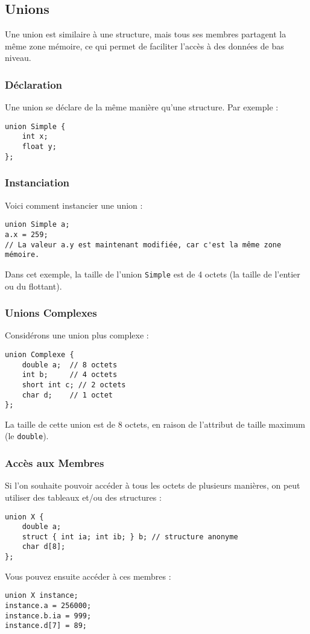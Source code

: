 \documentclass[french,11pt]{article}
\begin{document}
\subsection{Unions}
Une union est similaire à une structure, mais tous ses membres partagent la même zone mémoire, ce qui permet de faciliter l'accès à des données de bas niveau.

\subsubsection{Déclaration}
Une union se déclare de la même manière qu'une structure. Par exemple :
\begin{verbatim}
union Simple {
    int x;
    float y;
};
\end{verbatim}

\subsubsection{Instanciation}
Voici comment instancier une union :
\begin{verbatim}
union Simple a;
a.x = 259;
// La valeur a.y est maintenant modifiée, car c'est la même zone mémoire.
\end{verbatim}
Dans cet exemple, la taille de l'union \texttt{Simple} est de 4 octets (la taille de l'entier ou du flottant).

\subsubsection{Unions Complexes}
Considérons une union plus complexe :
\begin{verbatim}
union Complexe {
    double a;  // 8 octets
    int b;     // 4 octets
    short int c; // 2 octets
    char d;    // 1 octet
};
\end{verbatim}
La taille de cette union est de 8 octets, en raison de l'attribut de taille maximum (le \texttt{double}).

\subsubsection{Accès aux Membres}
Si l'on souhaite pouvoir accéder à tous les octets de plusieurs manières, on peut utiliser des tableaux et/ou des structures :
\begin{verbatim}
union X {
    double a;
    struct { int ia; int ib; } b; // structure anonyme
    char d[8];
};
\end{verbatim}
Vous pouvez ensuite accéder à ces membres :
\begin{verbatim}
union X instance;
instance.a = 256000;
instance.b.ia = 999;
instance.d[7] = 89;
\end{verbatim}
\end{document}
